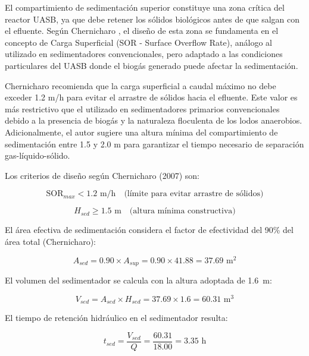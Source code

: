\documentclass[12pt,a4paper]{article}
\begin{document}
El compartimiento de sedimentación superior constituye una zona crítica del reactor UASB, ya que debe retener los sólidos biológicos antes de que salgan con el efluente. Según Chernicharo \cite{chernicharo2007}, el diseño de esta zona se fundamenta en el concepto de Carga Superficial (SOR - Surface Overflow Rate), análogo al utilizado en sedimentadores convencionales, pero adaptado a las condiciones particulares del UASB donde el biogás generado puede afectar la sedimentación.

Chernicharo recomienda que la carga superficial a caudal máximo no debe exceder 1.2 m/h para evitar el arrastre de sólidos hacia el efluente. Este valor es más restrictivo que el utilizado en sedimentadores primarios convencionales debido a la presencia de biogás y la naturaleza floculenta de los lodos anaerobios. Adicionalmente, el autor sugiere una altura mínima del compartimiento de sedimentación entre 1.5 y 2.0 m para garantizar el tiempo necesario de separación gas-líquido-sólido.

Los criterios de diseño según Chernicharo (2007) son:

\begin{equation}
\text{SOR}_{max} < 1.2 \text{ m/h} \quad \text{(límite para evitar arrastre de sólidos)}
\end{equation}

\begin{equation}
H_{sed} \geq 1.5 \text{ m} \quad \text{(altura mínima constructiva)}
\end{equation}

El área efectiva de sedimentación considera el factor de efectividad del 90\% del área total (Chernicharo):

\begin{equation}
A_{sed} = 0.90 \times A_{sup} = 0.90 \times 41.88 = 37.69 \text{ m}^2
\end{equation}

El volumen del sedimentador se calcula con la altura adoptada de 1.6~m:

\begin{equation}
V_{sed} = A_{sed} \times H_{sed} = 37.69 \times 1.6 = 60.31 \text{ m}^3
\end{equation}

El tiempo de retención hidráulico en el sedimentador resulta:

\begin{equation}
t_{sed} = \frac{V_{sed}}{Q} = \frac{60.31}{18.00} = 3.35 \text{ h}
\end{equation}
\end{document}
